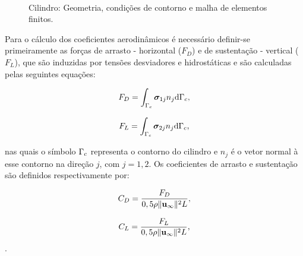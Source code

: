 \documentclass[tese_patricia]{subfiles}%
\begin{document}
\begin{figure}[!htb]
	\centering
	\\
	\caption{Cilindro: Geometria, condições de contorno e malha de elementos finitos.}
\end{figure}

Para o cálculo dos coeficientes aerodinâmicos é necessário definir-se primeiramente as forças de arrasto - horizontal ($F_D$) e de sustentação - vertical ($F_L$), que são induzidas por tensões desviadores e hidrostáticas e são calculadas pelas seguintes equações:

\begin{align}
F_D = \int_{\Gamma_{c}} \boldsymbol{\sigma}_{1j}n_{j} \mathrm{d}\Gamma_{c}, \label{eq:F_D}
\end{align}

\begin{align}
F_L = \int_{\Gamma_{c}} \boldsymbol{\sigma}_{2j}n_{j} \mathrm{d}\Gamma_{c},  \label{eq:F_L}
\end{align}

\noindent nas quais o símbolo $\Gamma_{c}$ representa o contorno do cilindro e $n_j$ é o vetor normal à esse contorno na direção $j$, com $j=1,2$. Os coeficientes de arrasto e sustentação são definidos respectivamente por:

\begin{align}
	C_D = \frac{F_D}{0,5\rho \lVert \mathbf{u}_{\infty} \lVert^{2} L},
\end{align}

\begin{align}
	C_L = \frac{F_L}{0,5\rho \lVert \mathbf{u}_{\infty} \lVert^{2} L},
\end{align}.
\end{document}
